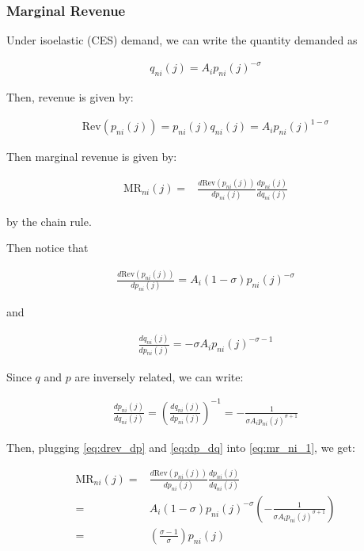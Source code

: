 \documentclass[10pt]{article}
\begin{document}
\subsubsection{Marginal Revenue}

Under isoelastic (CES) demand, 
we can write the quantity demanded as

\begin{align}
    q_{ni}(j)=A_i p_{n i}(j)^{-\sigma} 
\end{align}

Then, revenue is given by:

\begin{align}
    \text{Rev}(p_{n i}(j)) = p_{n i}(j) q_{ni}(j) = A_i p_{n i}(j)^{1-\sigma}
\end{align}

Then marginal revenue is given by:

\begin{align}
    \text{MR}_{n i}(j) = &\frac{d \text{Rev}(p_{n i}(j))}{dp_{n i}(j)} \frac{d p_{n i}(j)}{d q_{ni}(j)} \label{eq:mr_ni_1}
\end{align}

by the chain rule.

Then notice that

\begin{align}
    \frac{d \text{Rev}(p_{n i}(j))}{dp_{n i}(j)} = A_i (1-\sigma) p_{n i}(j)^{-\sigma} \label{eq:drev_dp}
\end{align}

and 

\begin{align}
    \frac{d q_{ni}(j)}{d p_{n i}(j)} = -\sigma A_i p_{n i}(j)^{-\sigma-1}
\end{align}

Since $q$ and $p$ are inversely related,
we can write:

\begin{align}
    \frac{d p_{n i}(j)}{d q_{ni}(j)} = \left(\frac{d q_{ni}(j)}{d p_{n i}(j)}\right)^{-1} = -\frac{1}{\sigma A_i p_{n i}(j)^{\sigma+1}} \label{eq:dp_dq}
\end{align}

Then, plugging 
\eqref{eq:drev_dp} and \eqref{eq:dp_dq} into \eqref{eq:mr_ni_1}, we get:

\begin{align}
    \text{MR}_{n i}(j) = &\frac{d \text{Rev}(p_{n i}(j))}{dp_{n i}(j)} \frac{d p_{n i}(j)}{d q_{ni}(j)}  \\
    = & A_i (1-\sigma) p_{n i}(j)^{-\sigma} \left(-\frac{1}{\sigma A_i p_{n i}(j)^{\sigma+1}}\right) \\
    = & \left(\frac{\sigma - 1}{\sigma}\right) p_{n i}(j)
\end{align}
\end{document}
